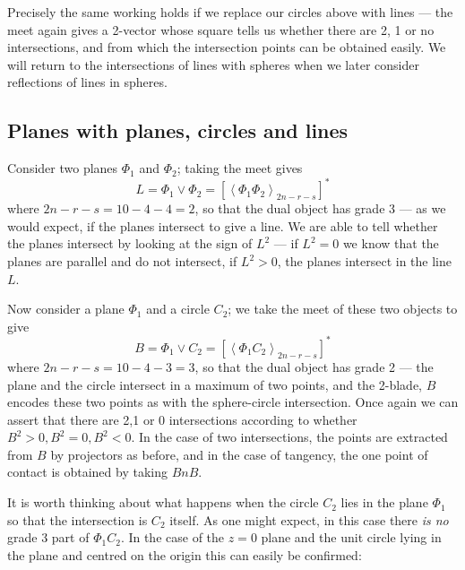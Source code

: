 Precisely the same working holds if we replace our
circles above with lines --- the meet again gives a
2-vector whose square tells us whether there are 2, 1 or
no intersections, and from which the intersection points
can be obtained easily. We will return to the
intersections of lines with spheres when we later
consider reflections of lines in spheres.





\subsection{Planes with planes, circles and lines }

Consider two planes $\Phi_1$ and $\Phi_2$; taking the
meet gives
%
\begin{equation}
L = \Phi_1 \vee \Phi_2 = \left[\left< \Phi_1 \Phi_2
\right>_{2n-r-s}\right]^*
\end{equation}
%
where $2n-r-s=10-4-4=2$, so that the dual object has
grade 3 --- as we would expect, if the planes intersect to
give a line. We are able to tell whether the planes
intersect by looking at the sign of $L^2$ --- if $L^2=0$
we know that the planes are parallel and do not
intersect, if $L^2>0$, the planes intersect in the line
$L$.

Now consider a plane $\Phi_1$ and a circle $C_2$; we take
the meet of these two objects to give
%
\begin{equation}
B = \Phi_1 \vee C_2 = \left[\left< \Phi_1 C_2
\right>_{2n-r-s}\right]^*
\end{equation}
%
where $2n-r-s=10-4-3=3$, so that the dual object has
grade 2 --- the plane and the circle intersect in a
maximum of two points, and the 2-blade, $B$ encodes these
two points as with the sphere-circle intersection. Once
again we can assert that there are 2,1 or 0 intersections
according to whether $B^2>0,B^2=0,B^2<0$. In the case of
two intersections, the points are extracted from $B$ by
projectors as before, and in the case of tangency, the
one point of contact is obtained by taking $BnB$.

It is worth thinking about what happens when the circle
$C_2$ lies in the plane $\Phi_1$ so that the intersection is
$C_2$ itself. As one might expect, in this case there \emph{is
no} grade 3 part of $\Phi_1C_2$. In the case of the $z=0$ plane and
the unit circle lying in the plane and centred on the origin this can
easily be confirmed:

